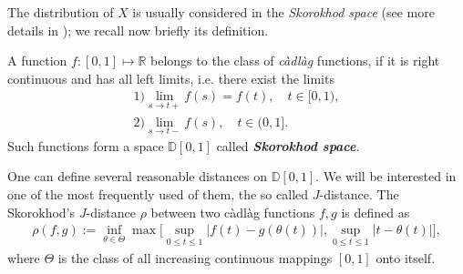 \documentclass[12pt]{article}
\newcommand\D{\mathbb D}
\newcommand\ro{\rho}
\theoremstyle{definition}
\newtheorem{definition}[theorem]{Definition}
\newtheorem{notation}[theorem]{Notation}
\begin{document}
\medskip

\bigskip

The distribution of $X$ is usually considered in the {\it Skorokhod space} (see more details in \cite{Skor1, Skor2, Bil, Whitt}); we recall now briefly its definition.
\medskip

A function $f:[0, 1] \mapsto \mathbb R$ belongs to the class of \textit{c\`adl\`ag} functions, if it is right continuous and has all left limits, i.e. there exist the limits
\begin{equation*}
            \begin{gathered}
                1)\lim_{s \to t+}f(s) = f(t), \quad  t\in[0,1),\\
                2)  \lim_{s \to t-} f(s), \quad  t\in(0,1] .
            \end{gathered}
\end{equation*}
Such functions form a space $\D[0,1]$ called \textbf{\it Skorokhod space}.

One can define several reasonable distances on $\D[0,1]$. We will be interested in one of the most frequently used of them, the so called $J$-distance.
The Skorokhod's  $J$-distance $\ro$ between two c\`adl\`ag functions $f, g$ is defined as
\[
            \begin{gathered}
                    \ro(f, g) := \inf_{\theta \in \Theta}
                    \max \big[
                            \sup_{0 \leq t\leq 1} |f(t) - g(\theta(t))|, 
                            \sup_{0\leq t\leq 1}|t-\theta(t)
                        |\big],
            \end{gathered}
\]
where $\Theta$ is the class of all increasing continuous mappings $[0,1]$ onto itself.
\end{document}
